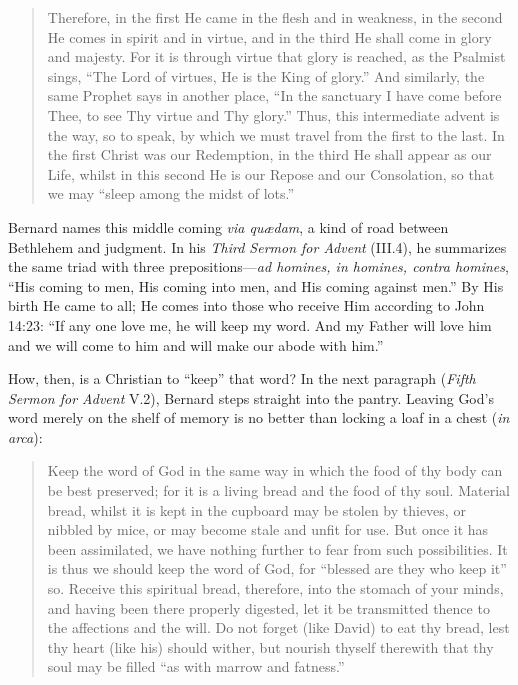 \begin{quote}
Therefore, in the first He came in the flesh and in weakness, in the second
He comes in spirit and in virtue, and in the third He shall come in glory
and majesty. For it is through virtue that glory is reached, as the
Psalmist sings, ``The Lord of virtues, He is the King of glory.'' And
similarly, the same Prophet says in another place, ``In the sanctuary I
have come before Thee, to see Thy virtue and Thy glory.'' Thus, this
intermediate advent is the way, so to speak, by which we must travel from
the first to the last. In the first Christ was our Redemption, in the third
He shall appear as our Life, whilst in this second He is our Repose and our
Consolation, so that we may ``sleep among the midst of lots.''
\end{quote}

Bernard names this middle coming \textit{via qu\ae dam}, a kind of road
between Bethlehem and judgment. In his \textit{Third Sermon for Advent}
(III.4), he summarizes the same triad with three prepositions---\textit{ad
homines, in homines, contra homines}, ``His coming to men, His coming into
men, and His coming against men.'' By His birth He came to all; He comes
into those who receive Him according to John 14:23: ``If any one love me,
he will keep my word. And my Father will love him and we will come to him
and will make our abode with him.''

How, then, is a Christian to ``keep'' that word? In the next paragraph
(\textit{Fifth Sermon for Advent} V.2), Bernard steps straight into the
pantry. Leaving God's word merely on the shelf of memory is no better than
locking a loaf in a chest (\textit{in arca}):

\begin{quote}
Keep the word of God in the same way in which the food of thy body can be
best preserved; for it is a living bread and the food of thy soul. Material
bread, whilst it is kept in the cupboard may be stolen by thieves, or
nibbled by mice, or may become stale and unfit for use. But once it has
been assimilated, we have nothing further to fear from such possibilities.
It is thus we should keep the word of God, for ``blessed are they who keep
it'' so. Receive this spiritual bread, therefore, into the stomach of your
minds, and having been there properly digested, let it be transmitted
thence to the affections and the will. Do not forget (like David) to eat
thy bread, lest thy heart (like his) should wither, but nourish thyself
therewith that thy soul may be filled ``as with marrow and fatness.''
\end{quote}

